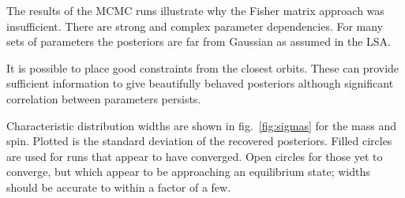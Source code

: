 \documentclass[11pt,twoside]{article}
\begin{document}
The results of the MCMC runs illustrate why the Fisher matrix approach was insufficient. There are strong and complex parameter dependencies. For many sets of parameters the posteriors are far from Gaussian as assumed in the LSA.

It is possible to place good constraints from the closest orbits. These can provide sufficient information to give beautifully behaved posteriors although significant correlation between parameters persists.

Characteristic distribution widths are shown in fig.~\ref{fig:sigmas} for the mass and spin. Plotted is the standard deviation of the recovered posteriors. Filled circles are used for runs that appear to have converged. Open circles for those yet to converge, but which appear to be approaching an equilibrium state; widths should be accurate to within a factor of a few.
\end{document}
